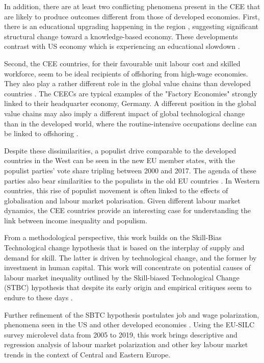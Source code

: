 \documentclass[11pt]{article}
\begin{document}
In addition, there are at least two conflicting phenomena present in the CEE that are likely to produce outcomes different from those of developed economies. First, there is an educational upgrading happening in the region \citep{hardy2018educational}, suggesting significant structural change toward a knowledge-based economy. These developments contrast with US economy which is experiencing an educational slowdown \citep{goldin2010race}.

Second, the CEE countries, for their favourable unit labour cost and skilled workforce, seem to be ideal recipients of offshoring from high-wage economies. They also play a rather different role in the global value chains than developed countries \citep{baldwin2015supply}. The CEECs are typical examples of the "Factory Economies" strongly linked to their headquarter economy, Germany. 
A different position in the global value chains may also imply a different impact of global technological change than in the developed world, where the routine-intensive occupations decline can be linked to offshoring \citep{acemoglu2012does}.

Despite these dissimilarities, a populist drive comparable to the developed countries in the West can be seen in the new EU member states, with the populist parties' vote share tripling between 2000 and 2017. The agenda of these parties also bear similarities to the populists in the old EU countries \citep{orenstein2022work}. In Western countries, this rise of populist movement is often linked to the effects of globalisation and labour market polarisation. Given different labour market dynamics, the CEE countries provide an interesting case for understanding the link between income inequality and populism. 



From a methodological perspective, this work builds on the Skill-Bias Technological change hypothesis \citep{katz1992changes} that is based on the interplay of supply and demand for skill. The latter is driven by technological change, and the former by investment in human capital. This work will concentrate on potential causes of labour market inequality outlined by the Skill-biased Technological Change (STBC) hypothesis that despite its early origin \citep{katz1992changes} and empirical critiques seem to endure to these days \citep{aziz2021between, goldin2020extending}.

Further refinement of the SBTC hypothesis postulates job and wage polarization, phenomena seen in the US and other developed economies \citep{rodrik2020economic, temin2018vanishing}. Using the EU-SILC survey microlevel data from 2005 to 2019, this work brings descriptive and regression analysis of labour market polarization and other key labour market trends in the context of Central and Eastern Europe.
\end{document}
